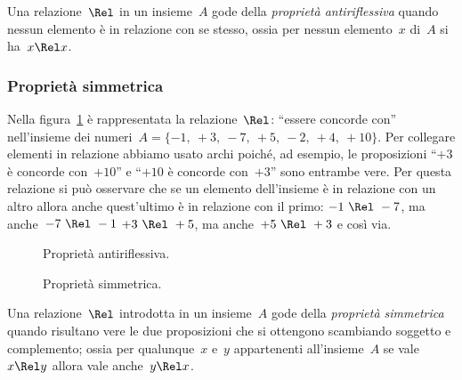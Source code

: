 \begin{definizione}
Una relazione~$\Rel$ in un insieme~$A$ gode della \emph{proprietà 
antiriflessiva} quando nessun elemento è in relazione con se stesso,
ossia per nessun elemento~$x$ di~$A$ si ha~$x \Rel x$.
\end{definizione}

\subsubsection{Proprietà simmetrica}

\begin{exrig}
 \begin{esempio}
Nella figura~\ref{fig:B.4} è rappresentata la relazione~$\Rel$: ``essere 
concorde con'' nell'insieme dei 
numeri~$A = \lbrace -1,~+3,~-7,~+5,~-2,~+4,~+10 \rbrace$.
Per collegare elementi in relazione abbiamo usato archi poiché, ad esempio, le 
proposizioni ``$+3$ è concorde con~$+10$'' e ``$+10$ è concorde con~$+3$''
sono entrambe vere. Per questa relazione si può osservare che se un elemento 
dell'insieme è in relazione con un altro allora anche quest'ultimo
è in relazione con il primo:
$-1~\Rel~-7$, ma anche~$-7~\Rel~-1$ $+3~\Rel~+5$, ma anche~$+5~\Rel~+3$ e così 
via.
 \end{esempio}
\end{exrig}

\begin{inaccessibleblock}
 \begin{figure}[t]
\begin{minipage}[t]{.45\textwidth}
 \centering
 
 \caption{Proprietà antiriflessiva.}\label{fig:B.3}
\end{minipage}\hfil
\begin{minipage}[t]{.45\textwidth}
 \centering
 
 \caption{Proprietà simmetrica.}\label{fig:B.4}
\end{minipage}
\end{figure}
\end{inaccessibleblock}

\begin{definizione}
Una relazione~$\Rel$ introdotta in un insieme~$A$ gode della \emph{proprietà 
simmetrica} quando risultano vere le due proposizioni
che si ottengono scambiando soggetto e complemento; ossia per qualunque~$x$ 
e~$y$ appartenenti all'insieme~$A$ se vale~$x \Rel y$
allora vale anche~$y \Rel x$.
\end{definizione}

